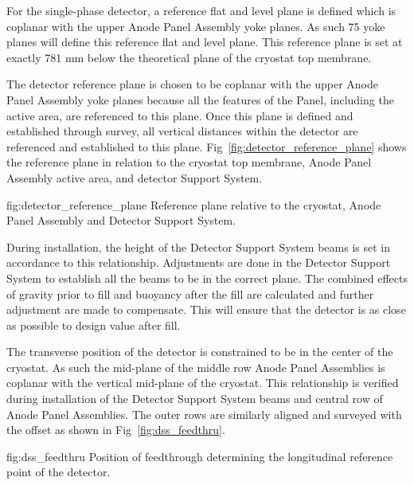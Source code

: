 For the single-phase detector, a reference flat and level plane is
defined which is coplanar with the upper Anode Panel Assembly yoke
planes. As such 75 yoke planes will define this reference flat and
level plane. This reference plane is set at exactly 781 mm below the
theoretical plane of the cryostat top membrane.

The detector reference plane is chosen to be coplanar with the upper
Anode Panel Assembly yoke planes because all the features of the
Panel, including the active area, are referenced to this plane.  Once
this plane is defined and established through survey, all vertical
distances within the detector are referenced and established to this
plane.  Fig~\ref{fig:detector_reference_plane} shows the reference
plane in relation to the cryostat top membrane, Anode Panel Assembly
active area, and detector Support System.
\begin{dunefigure}{fig:detector_reference_plane}
  {Reference plane relative to the cryostat, Anode Panel Assembly and Detector Support System.}
\end{dunefigure}

During installation, the height of the Detector Support System beams
is set in accordance to this relationship. Adjustments are done in the
Detector Support System to establish all the beams to be in the
correct plane. The combined effects of gravity prior to fill and
buoyancy after the fill are calculated and further adjustment are made
to compensate. This will ensure that the detector is as close as
possible to design value after fill.

The transverse position of the detector is constrained to be in the
center of the cryostat. As such the mid-plane of the middle row Anode
Panel Assemblies is coplanar with the vertical mid-plane of the
cryostat. This relationship is verified during installation of the
Detector Support System beams and central row of Anode Panel
Assemblies. The outer rows are similarly aligned and surveyed with the
offset as shown in Fig~\ref{fig:dss_feedthru}.
\begin{dunefigure}{fig:dss_feedthru}
  {Position of feedthrough determining the longitudinal reference point of the detector.}
\end{dunefigure}


